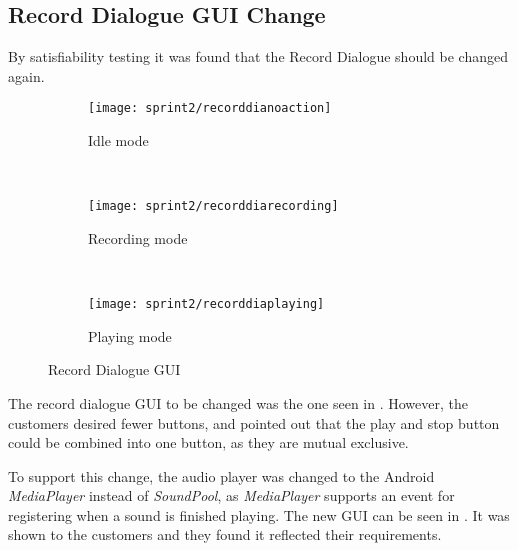\subsection{Record Dialogue GUI Change}
By satisfiability testing it was found that the Record Dialogue should be changed again.

\begin{figure}[h]
        \centering
        \begin{subfigure}[b]{0.3\textwidth}
                \texttt{[image: sprint2/recorddianoaction]}
                \caption{Idle mode}
                \label{fig:recordnoaction}
        \end{subfigure}%
        ~ %
        \begin{subfigure}[b]{0.3\textwidth}
                \texttt{[image: sprint2/recorddiarecording]}
                \caption{Recording mode}
                \label{fig:recordrecording}
        \end{subfigure}
        ~ %
        \begin{subfigure}[b]{0.3\textwidth}
                \texttt{[image: sprint2/recorddiaplaying]}
                \caption{Playing mode}
                \label{fig:recordplaying}
        \end{subfigure}
        \caption{Record Dialogue GUI}\label{fig:recorddia}
\end{figure}

The record dialogue GUI to be changed was the one seen in .
However, the customers desired fewer buttons, and pointed out that the play and stop button could be combined into one button, as they are mutual exclusive.

To support this change, the audio player was changed to the Android \textit{MediaPlayer} instead of \textit{SoundPool}, as \textit{MediaPlayer} supports an event for registering when a sound is finished playing.
The new GUI can be seen in .
It was shown to the customers and they found it reflected their requirements.